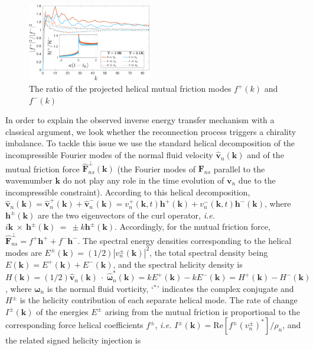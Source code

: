 \documentclass[%
 reprint,
 amsmath,amssymb,
 aps,
 prl,
]{revtex4-2}
\def \k{\mathbf{k}}
\def \h{\mathbf{h}}
\begin{document}
{\begin{figure}[b]
    \centering
    \includegraphics*[width=0.48\textwidth]{fmfDecompFig.pdf}
    \caption{The ratio of the projected helical mutual friction modes $f^+(k)$ and $f^-(k)$}
    \label{fig:mutual-friction-decomp}
\end{figure}


In order to explain the observed inverse energy transfer mechanism with a classical argument, 
we look whether the reconnection process triggers a chirality imbalance. To tackle this issue we use the standard helical decomposition \cite{waleffe-1992} 
of the incompressible Fourier modes of the normal fluid velocity $\hat{\mathbf{v}}_n(\k)$ and of the mutual friction force $\hat{\mathbf{F}}_{ns}^{\perp}(\k)$ 
(the  Fourier modes of $\mathbf{F}_{ns}$ parallel to the wavemumber $\k$ do not play any role in the time evolution of $\mathbf{v}_n$ due to the incompressible 
constraint). According to this helical decomposition, 
$\hat{\mathbf{v}}_n (\k) = \hat{\mathbf{v}}_n^+(\k) +\hat{\mathbf{v}}_n^-(\k) = v_n^+(\mathbf{k},t) \mathbf{h}^+(\mathbf{k}) + v_n^-(\mathbf{k},t) \mathbf{h}^-(\mathbf{k})$, 
where $\mathbf{h}^\pm (\mathbf{k})$ are the two eigenvectors of the curl operator, \textit{i.e.} $i\k~\times~\h^{\pm}(\k)~=~\pm k \h^{\pm}(\k)$. Accordingly, for the mutual friction force, $\hat{\mathbf{F}}_{ns}^{\perp} = f^+ \mathbf{h}^+ + f^- \mathbf{h}^-$. 
The spectral energy densities corresponding to the helical modes are
$E^{\pm}(\k) = (1/2) |v_n^\pm(\k)|^2$, the total spectral density being $E(\k) = E^{+}(\k) + E^{-}(\k)$, and the spectral helicity density is 
$H(\k) = (1/2) \hat{\mathbf{v}}_n (\k)\!\!\! ~\cdot~\!\!\! \hat{\bm{\omega}}_n^* (\k) = k E^+(\k) - k E^-(\k) = H^+(\k) - H^-(\k)$, 
where $\bm{\omega}_n$ is the normal fluid vorticity, `$^\ast$' indicates the complex conjugate and 
$H^\pm$ is the helicity contribution of each separate helical mode. 
The rate of change $I^\pm(\k)$ of the energies $E^{\pm}$ arising from the mutual friction is proportional to the corresponding force helical coefficients
$f^\pm$, \textit{i.e.} $I^\pm(\k) = \mathrm{Re} [f^\pm (v_n^\pm)^*] /\rho_n$, and the related signed helicity injection is 
}
\end{document}

